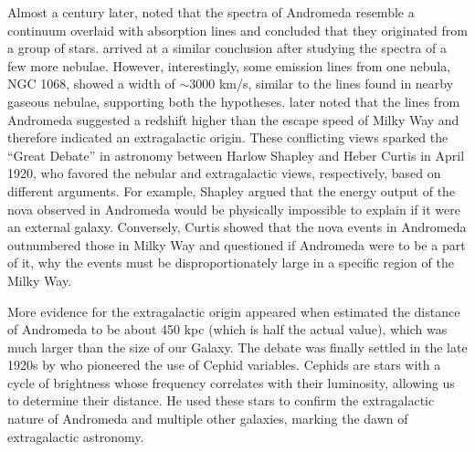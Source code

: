 Almost a century later, \citet{huggins1864xiii} noted that the spectra of Andromeda resemble a continuum overlaid with absorption lines and concluded that they originated from a group of stars. \citet{fath1909spectra} arrived at a similar conclusion after studying the spectra of a few more nebulae. However, interestingly, some emission lines from one nebula, NGC 1068, showed a width of  $\sim$3000 km/s, similar to the lines found in nearby gaseous nebulae, supporting both the hypotheses. \citet{slipher1913radial} later noted that the lines from Andromeda suggested a redshift higher than the escape speed of Milky Way and therefore indicated an extragalactic origin. These conflicting views sparked the ``Great Debate'' in astronomy \citep{1921BuNRC...2..171S} between Harlow Shapley and Heber Curtis in April 1920, who favored the nebular and extragalactic views, respectively, based on different arguments. For example, Shapley argued that the energy output of the nova observed in Andromeda \citep{1888MNRAS..48..108B} would be physically impossible to explain if it were an external galaxy. Conversely, Curtis showed that the nova events in Andromeda outnumbered those in Milky Way and questioned if Andromeda were to be a part of it, why the events must be disproportionately large in a specific region of the Milky Way.

More evidence for the extragalactic origin appeared when \citet{opik1922estimate}  estimated the distance of Andromeda to be about 450 kpc (which is half the actual value), which was much larger than the size of our Galaxy. The debate was finally settled in the late 1920s by \citet{hubble1929relation} who pioneered the use of Cephid variables. Cephids are stars with a cycle of brightness whose frequency correlates with their luminosity, allowing us to determine their distance. He used these stars to confirm the extragalactic nature of Andromeda and multiple other galaxies, marking the dawn of extragalactic astronomy.

